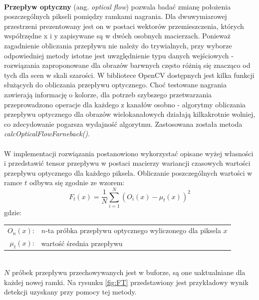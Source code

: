 \paragraph{}
\textbf{Przepływ optyczny} (ang. \textit{optical flow}) pozwala badać zmianę położenia poszczególnych pikseli pomiędzy ramkami nagrania. Dla dwuwymiarowej przestrzeni prezentowany jest on w postaci wektorów przemieszczenia, których współrzędne x i y zapisywane są w dwóch osobnych macierzach. Ponieważ zagadnienie obliczania przepływu nie należy do trywialnych, przy wyborze odpowiedniej metody istotne jest uwzględnienie typu danych wejściowych - rozwiązania zaproponowane dla obrazów barwnych często różnią się znacząco od tych dla scen w skali szarości. W bibliotece OpenCV dostępnych jest kilka funkcji służących do obliczania przepływu optycznego. Choć testowane nagrania zawierają informację o kolorze, dla potrzeb szybszego przetwarzania przeprowadzono operacje dla każdego z kanałów osobno - algorytmy obliczania przepływu optycznego dla obrazów wielokanałowych działają kilkakrotnie wolniej, co zdecydowanie pogarsza wydajność algorytmu. Zastosowana została metoda \textit{calcOpticalFlowFarneback()}. 
\paragraph{}
W implementacji rozwiązania postanowiono wykorzystać opisane wyżej własności i przedstawić tensor przepływu w postaci macierzy wariancji czasowych wartości przepływu optycznego dla każdego piksela. Obliczanie poszczególnych wartości w ramce $t$ odbywa się zgodnie ze wzorem:
\begin{equation}
F_{t}(x) = \frac{1}{N}\sum_{i=1}^{N} (O_{i}(x)-\mu_{t}(x))^2
\end{equation}
gdzie:\\ 
\hspace*{3em}
\begin{tabular}{r l}
$O_{n}(x)$: &  $n$-ta próbka przepływu optycznego wyliczonego dla piksela $x$\\
$\mu_{t}(x)$: & wartość średnia przepływu
\end{tabular} \\

$N$ próbek przepływu przechowywanych jest w buforze, są one uaktualniane dla każdej nowej ramki. Na rysunku \ref{fig:FT} przedstawiony jest przykładowy wynik detekcji uzyskany przy pomocy tej metody.

